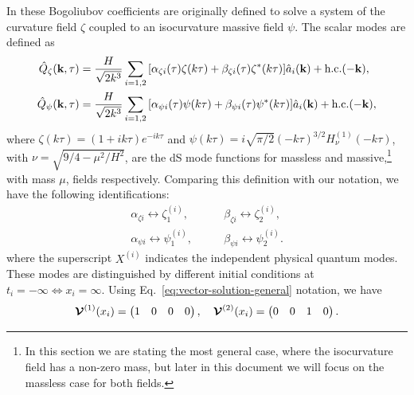 \documentclass[
 aip,
 jmp,
 amsmath,amssymb,
 reprint,
 nofootinbib,
]{revtex4-2}
\newcommand{\bk}{\vb{k}}
\def\mV{{\vb*{\mathcal{V}}}}
\begin{document}
In \cite{Fumagalli_2022} these Bogoliubov coefficients are originally defined to solve a system of the curvature field $\zeta$ coupled to an isocurvature massive field $\psi$. The scalar modes are defined as
\begin{align}
    \hat{Q}_\zeta (\bk, \tau) & = \frac{H}{\sqrt{2 k^3}} \sum_{i=1,2} \qty[\alpha_{\zeta i}(\tau)\zeta(k \tau) + \beta_{\zeta i}(\tau) \zeta^*(k \tau)] \hat{a}_i(\bk) + \text{h.c.}(- \bk), \\
    \hat{Q}_\psi (\bk, \tau) & = \frac{H}{\sqrt{2 k^3}} \sum_{i=1,2} \qty[\alpha_{\psi i}(\tau)\psi(k \tau) + \beta_{\psi i}(\tau) \psi^*(k \tau)] \hat{a}_i(\bk) + \text{h.c.}(- \bk),
\end{align}
where $\zeta(k \tau) = (1 + i k \tau) e^{- i k \tau}$ and $\psi(k \tau) = i \sqrt{\pi/2} (- k \tau)^{3/2} H_\nu^{(1)} (- k \tau)$, with $\nu = \sqrt{9/4 - \mu^2/H^2}$, are the dS mode functions for massless and massive,\footnote{In this section we are stating the most general case, where the isocurvature field has a non-zero mass, but later in this document we will focus on the massless case for both fields.} with mass $\mu$, fields respectively. Comparing this definition with our notation, we have the following identifications:
\begin{equation}
    \begin{aligned}
        \alpha_{\zeta i} \leftrightarrow \zeta_1^{(i)},& \qquad \beta_{\zeta i} \leftrightarrow \zeta_2^{(i)}, \\
        \alpha_{\psi i} \leftrightarrow \psi_1^{(i)},& \qquad \beta_{\psi i} \leftrightarrow \psi_2^{(i)}.
    \end{aligned}
\end{equation}
where the superscript $X^{(i)}$ indicates the independent physical quantum modes. These modes are distinguished by different initial conditions at $t_i = - \infty \Leftrightarrow x_i = \infty$. Using Eq.~\eqref{eq:vector-solution-general} notation, we have
\begin{equation}
    \mV^{(1)}(x_i) = \begin{pmatrix} 1 & 0 & 0 & 0 \end{pmatrix}, \quad \mV^{(2)}(x_i) = \begin{pmatrix} 0 & 0 & 1 & 0 \end{pmatrix}.%
    \label{eq:two-sets-initial-conditions}
\end{equation}
\end{document}
